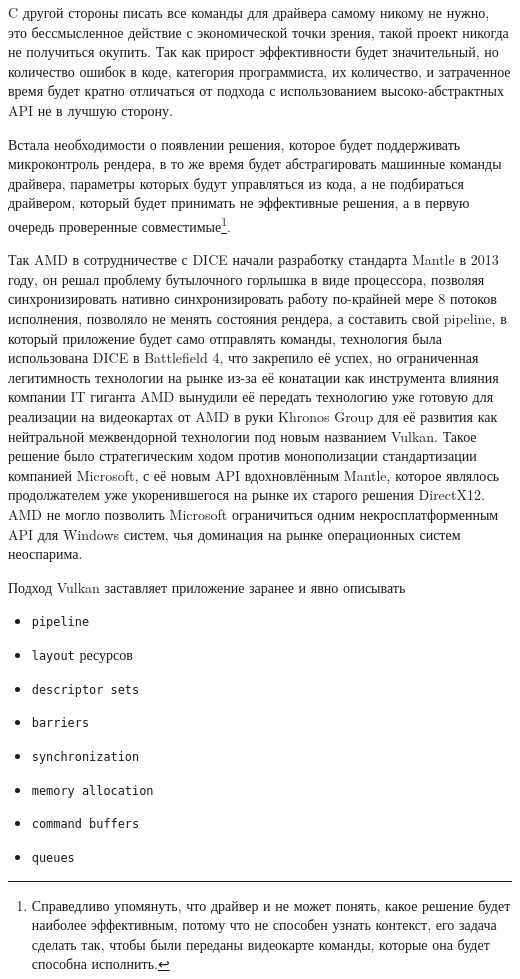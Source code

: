 \documentclass[12pt,a4paper]{article}
\begin{document}
C другой стороны писать все команды для драйвера самому никому не нужно, это 
бессмысленное действие с экономической точки зрения, такой проект никогда не получиться
окупить. Так как прирост эффективности будет значительный, но количество ошибок в коде, 
категория программиста, их количество, и затраченное время будет кратно отличаться от 
подхода с использованием высоко-абстрактных API не в лучшую сторону.

Встала необходимости о появлении решения, которое будет поддерживать микроконтроль рендера,
в то же время будет абстрагировать машинные команды драйвера, параметры которых
будут управляться из кода, а не подбираться драйвером, который будет принимать не
эффективные решения, а в первую очередь проверенные совместимые\footnote{
Справедливо упомянуть, что драйвер и не может понять, какое решение будет наиболее эффективным, 
потому что не способен узнать контекст, его задача сделать так, чтобы были переданы видеокарте 
команды, которые она будет способна исполнить.
}.

Так AMD в сотрудничестве с DICE начали разработку стандарта Mantle в 2013 году, он 
решал проблему бутылочного горлышка в виде процессора, позволяя синхронизировать нативно
синхронизировать работу по-крайней мере 8 потоков исполнения, позволяло не менять 
состояния рендера, а составить свой pipeline, в который приложение будет само 
отправлять команды, технология была использована DICE в Battlefield 4, что закрепило её
успех, но ограниченная легитимность технологии на рынке из-за её конатации как инструмента 
влияния компании IT гиганта AMD вынудили её передать технологию уже готовую для реализации
на видеокартах от AMD в руки Khronos Group для её развития как нейтральной межвендорной
технологии под новым названием Vulkan. Такое решение было стратегическим ходом против 
монополизации стандартизации компанией Microsoft, с её новым API вдохновлённым Mantle, 
которое являлось продолжателем уже укоренившегося на рынке их старого решения DirectX12.
AMD не могло позволить Microsoft ограничиться одним некросплатформенным API для Windows
систем, чья доминация на рынке операционных систем неоспарима.

\vspace{1em}

\noindent Подход Vulkan заставляет приложение заранее и явно описывать
\begin{itemize}
	\item \texttt{pipeline}
	\item \texttt{layout} ресурсов
	\item \texttt{descriptor sets}
	\item \texttt{barriers}
	\item \texttt{synchronization}
	\item \texttt{memory allocation}
	\item \texttt{command buffers}
	\item \texttt{queues}
\end{itemize}
\end{document}
